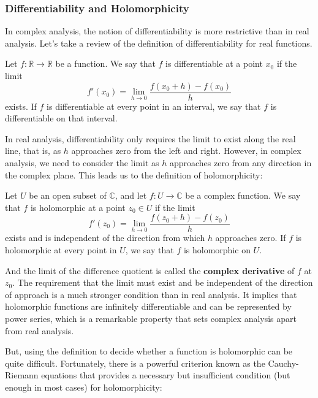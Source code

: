 \subsubsection{Differentiability and Holomorphicity}

In complex analysis, the notion of differentiability is more restrictive than in real analysis. Let's take a review of the definition of differentiability for real functions.

\begin{definition}
    Let $f: \mathbb{R} \to \mathbb{R}$ be a function. We say that $f$ is differentiable at a point $x_0$ if the limit
    \begin{equation}
        f'(x_0) = \lim_{h \to 0} \frac{f(x_0 + h) - f(x_0)}{h}
    \end{equation}
    exists. If $f$ is differentiable at every point in an interval, we say that $f$ is differentiable on that interval.
\end{definition}

In real analysis, differentiability only requires the limit to exist along the real line, that is, as $h$ approaches zero from the left and right. However, in complex analysis, we need to consider the limit as $h$ approaches zero from any direction in the complex plane. This leads us to the definition of holomorphicity:

\begin{definition}
    Let $U$ be an open subset of $\mathbb{C}$, and let $f: U \to \mathbb{C}$ be a complex function. We say that $f$ is holomorphic at a point $z_0 \in U$ if the limit
    \begin{equation}
        f'(z_0) = \lim_{h \to 0} \frac{f(z_0 + h) - f(z_0)}{h}
    \end{equation}
    exists and is independent of the direction from which $h$ approaches zero. If $f$ is holomorphic at every point in $U$, we say that $f$ is holomorphic on $U$.
\end{definition}

And the limit of the difference quotient is called the \textbf{complex derivative} of $f$ at $z_0$. The requirement that the limit must exist and be independent of the direction of approach is a much stronger condition than in real analysis. It implies that holomorphic functions are infinitely differentiable and can be represented by power series, which is a remarkable property that sets complex analysis apart from real analysis.

But, using the definition to decide whether a function is holomorphic can be quite difficult. Fortunately, there is a powerful criterion known as the Cauchy-Riemann equations that provides a necessary but insufficient condition (but enough in most cases) for holomorphicity:

